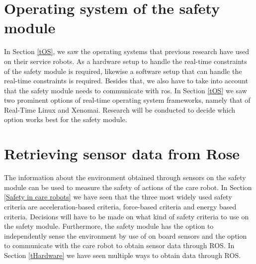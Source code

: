 \documentclass[12pt]{scrreprt}
\begin{document}
\section{Operating system of the safety module}
In Section \ref{tOS}, we saw the operating systems that previous research have used on their service robots.
As a hardware setup to handle the real-time constraints of the safety module is required, likewise a software setup that can handle the real-time constraints is required. Besides that, we also have to take into account that the safety module needs to communicate with \acrshort{ros}. In Section \ref{tOS} we saw two prominent options of real-time operating system frameworks, namely that of Real-Time Linux and Xenomai. Research will be conducted to decide which option works best for the safety module.


\section{Retrieving sensor data from Rose}
\label{Retrieving sensor data from Rose}

The information about the environment obtained through sensors on the safety module can be used to measure the safety of actions of the care robot. In Section \ref{Safety in care robots} we have seen that the three most widely used safety criteria are acceleration-based criteria, force-based criteria and energy based criteria. Decisions will have to be made on what kind of safety criteria to use on the safety module. Furthermore, the safety module has the option to independently sense the environment by use of on board sensors and the option to communicate with the care robot to obtain sensor data through ROS. In Section \ref{tHardware} we have seen multiple ways to obtain data through ROS.

\end{document}
